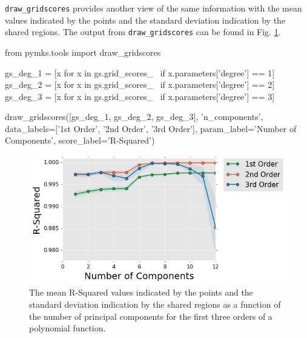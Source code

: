\documentclass{bmcart}
\newcommand{\fimage}
{\fcolorbox{outcolor}{white}}
{}
\begin{document}
    \texttt{draw\_gridscores} provides another view of the same information
with the mean values indicated by the points and the standard deviation
indication by the shared regions. The output from \texttt{draw\_gridscores}
can be found in Fig. \ref{fig:drawGridscores}.


\begin{_input}
from pymks.tools import draw_gridscores

gs_deg_1 = [x for x in gs.grid_scores_ \
            if x.parameters['degree'] == 1]
gs_deg_2 = [x for x in gs.grid_scores_ \
            if x.parameters['degree'] == 2]
gs_deg_3 = [x for x in gs.grid_scores_ \
            if x.parameters['degree'] == 3]

draw_gridscores([gs_deg_1,  gs_deg_2, gs_deg_3], 'n_components',
                data_labels=['1st Order',
                             '2nd Order', '3rd Order'],
                param_label='Number of Components',
                score_label='R-Squared')

\end{_input}

\begin{figure}
    \centering
    \includegraphics[scale=.625]{pymks_paper_homogenization_files/pymks_paper_homogenization_15_0.png}
    \caption{The mean R-Squared values indicated by the points and the standard deviation
indication by the shared regions as a function of the number of principal components for the first
three orders of a polynomial function.}
    \label{fig:drawGridscores}
\end{figure}

\end{document}
